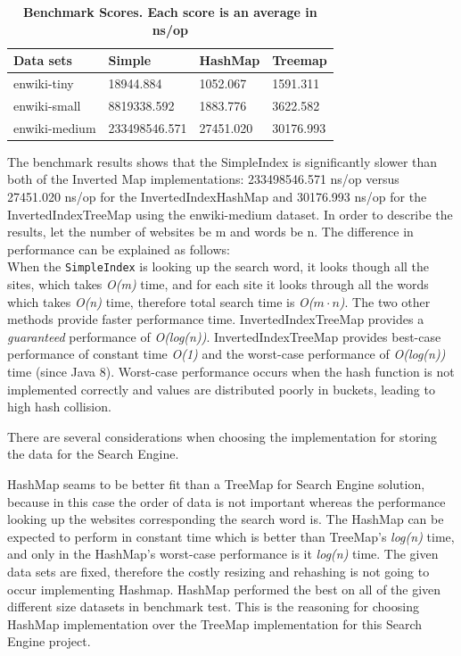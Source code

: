 \begin{table}[!htbp]
    \caption{\textbf{Benchmark Scores. Each score is an average in ns/op}}
    \begin{tabular}{|p{75pt}|p{75pt}|p{75pt}|p{75pt}|}
        \hline
        \textbf{Data sets} & \textbf{Simple} & \textbf{HashMap} & \textbf{Treemap} \\ \hline
        enwiki-tiny & 18944.884 & 1052.067 & 1591.311 \\ \hline
        enwiki-small & 8819338.592 & 1883.776 & 3622.582 \\ \hline
        enwiki-medium & 233498546.571 & 27451.020 & 30176.993 \\ \hline
    \end{tabular}
    \label{table:result}
\end{table}


The benchmark results shows that the SimpleIndex is significantly slower than both of the Inverted Map implementations: 233498546.571 ns/op versus 27451.020 ns/op for the InvertedIndexHashMap and 30176.993 ns/op for the InvertedIndexTreeMap using the enwiki-medium dataset.
In order to describe the results, let the number of websites be m and words be n.
The difference in performance can be explained as follows: \\
When the {\tt SimpleIndex} is looking up the search word, it looks though all the sites, which takes \textit{O(m)} time, and for each site it looks through all the words which takes \textit{O(n)} time, therefore total search time is \textit{O($m\cdot n$)}. The two other methods provide faster performance time. InvertedIndexTreeMap provides a \textit{guaranteed} performance of \textit{O(log(n))}. InvertedIndexTreeMap provides best-case performance of constant time \textit{O(1)} and the worst-case performance of \textit{O(log(n))} time (since Java 8). Worst-case performance occurs when the hash function is not implemented correctly and values are distributed poorly in buckets, leading to high hash collision.

There are several considerations when choosing the implementation for storing the data for the Search Engine.

HashMap seams to be better fit than a TreeMap for Search Engine solution, because in this case the order of data is not important whereas the performance looking up the websites corresponding the search word is. The HashMap can be expected to perform in constant time which is better than TreeMap's \textit{log(n)} time, and only in the HashMap's worst-case performance is it \textit{log(n)} time. The given data sets are fixed, therefore the costly resizing and rehashing is not going to occur implementing Hashmap. HashMap performed the best on all of the given different size datasets in benchmark test. This is the reasoning for choosing HashMap implementation over the TreeMap implementation for this Search Engine project.





